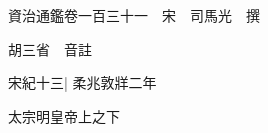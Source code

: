






























































資治通鑑卷一百三十一　宋　司馬光　撰

胡三省　音註

宋紀十三|{
	柔兆敦牂二年}


太宗明皇帝上之下

